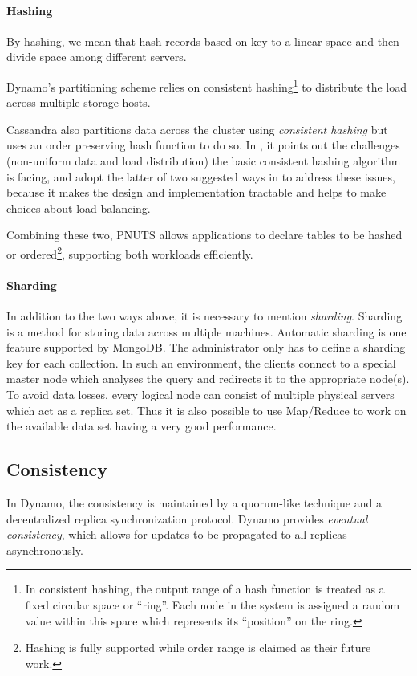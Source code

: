 \documentclass[12pt,letter]{article}
\begin{document}
\paragraph*{Hashing}
By hashing, we mean that hash records based on key to a linear space and then divide space among different servers.

Dynamo's partitioning scheme relies on consistent hashing\footnote{In consistent hashing, the output range of a hash function is treated as a fixed circular space or ``ring''. Each node in the system is assigned a random value within this space which represents its ``position'' on the ring.} to distribute the load across multiple storage hosts. 

Cassandra also partitions data across the cluster using \textit{consistent hashing} but uses an order preserving hash function to do so. In \citep{LakshamAvinash2010}, it points out the challenges (non-uniform data and load distribution) the basic consistent hashing algorithm\citep{Karger1997} is facing, and adopt the latter of two suggested ways in \citep{Stoica2003} to address these issues, because it makes the design and implementation tractable and helps to make choices about load balancing.

Combining these two, PNUTS allows applications to declare tables to be hashed or ordered\footnote{Hashing is fully supported while order range is claimed as their future work.}, supporting both workloads efficiently.

\paragraph*{Sharding}
In addition to the two ways above, it is necessary to mention \textit{sharding}. Sharding is a method for storing data across multiple machines. Automatic sharding is one feature supported by MongoDB. The administrator only has to define a sharding key for each collection. In such an environment, the clients connect to a special master node which analyses the query and redirects it to the appropriate node(s). To avoid data losses, every logical node can consist of multiple physical servers which act as a replica set. Thus it is also possible to use Map/Reduce to work on the available data set having a very good performance.

\subsection{Consistency}
In Dynamo, the consistency is maintained by a quorum-like technique and a decentralized replica synchronization protocol.\citep{DeCandia2007} Dynamo provides \textit{eventual consistency}, which allows for updates to be propagated to all replicas asynchronously.
\end{document}
